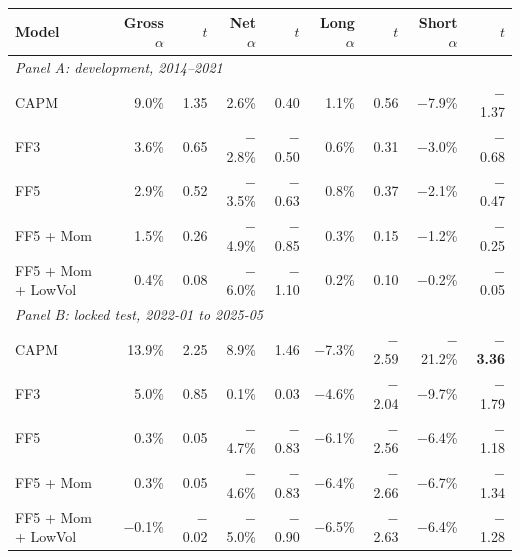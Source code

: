 \begin{tabular}{lrrrrrrrr}
\toprule
Model & Gross $\alpha$ & $t$ & Net $\alpha$ & $t$ & Long $\alpha$ & $t$ & Short $\alpha$ & $t$ \\
\midrule
\multicolumn{9}{l}{\textit{Panel A: development, 2014--2021}} \\
CAPM & 9.0\% & 1.35 & 2.6\% & 0.40 & 1.1\% & 0.56 & \ensuremath{-}7.9\% & \ensuremath{-}1.37 \\
FF3 & 3.6\% & 0.65 & \ensuremath{-}2.8\% & \ensuremath{-}0.50 & 0.6\% & 0.31 & \ensuremath{-}3.0\% & \ensuremath{-}0.68 \\
FF5 & 2.9\% & 0.52 & \ensuremath{-}3.5\% & \ensuremath{-}0.63 & 0.8\% & 0.37 & \ensuremath{-}2.1\% & \ensuremath{-}0.47 \\
FF5 + Mom & 1.5\% & 0.26 & \ensuremath{-}4.9\% & \ensuremath{-}0.85 & 0.3\% & 0.15 & \ensuremath{-}1.2\% & \ensuremath{-}0.25 \\
FF5 + Mom + LowVol & 0.4\% & 0.08 & \ensuremath{-}6.0\% & \ensuremath{-}1.10 & 0.2\% & 0.10 & \ensuremath{-}0.2\% & \ensuremath{-}0.05 \\
\midrule
\multicolumn{9}{l}{\textit{Panel B: locked test, 2022-01 to 2025-05}} \\
CAPM & 13.9\% & 2.25 & 8.9\% & 1.46 & \ensuremath{-}7.3\% & \ensuremath{-}2.59 & \ensuremath{-}21.2\% & \textbf{\ensuremath{-}3.36} \\
FF3 & 5.0\% & 0.85 & 0.1\% & 0.03 & \ensuremath{-}4.6\% & \ensuremath{-}2.04 & \ensuremath{-}9.7\% & \ensuremath{-}1.79 \\
FF5 & 0.3\% & 0.05 & \ensuremath{-}4.7\% & \ensuremath{-}0.83 & \ensuremath{-}6.1\% & \ensuremath{-}2.56 & \ensuremath{-}6.4\% & \ensuremath{-}1.18 \\
FF5 + Mom & 0.3\% & 0.05 & \ensuremath{-}4.6\% & \ensuremath{-}0.83 & \ensuremath{-}6.4\% & \ensuremath{-}2.66 & \ensuremath{-}6.7\% & \ensuremath{-}1.34 \\
FF5 + Mom + LowVol & \ensuremath{-}0.1\% & \ensuremath{-}0.02 & \ensuremath{-}5.0\% & \ensuremath{-}0.90 & \ensuremath{-}6.5\% & \ensuremath{-}2.63 & \ensuremath{-}6.4\% & \ensuremath{-}1.28 \\
\bottomrule
\end{tabular}
